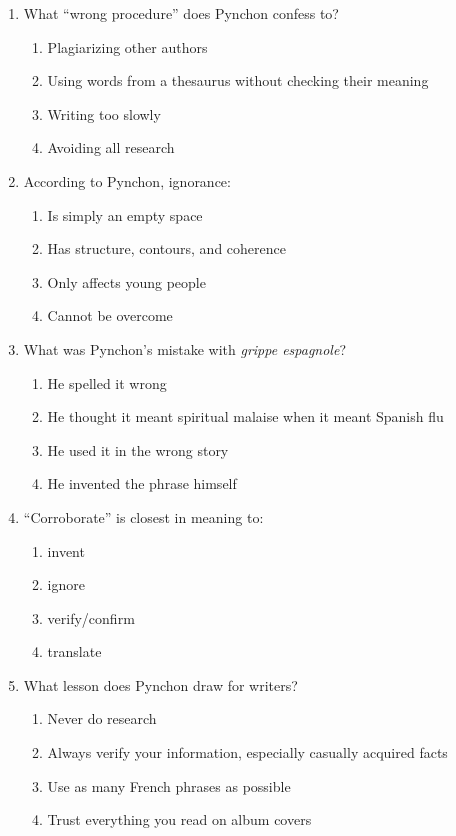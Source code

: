 \documentclass[10pt,a4paper]{article}
\begin{document}
\begin{enumerate}[label=\textbf{\arabic*.}, leftmargin=*]

\item What ``wrong procedure'' does Pynchon confess to?
\begin{enumerate}[label=(\Alph*)]
\item Plagiarizing other authors
\item Using words from a thesaurus without checking their meaning
\item Writing too slowly
\item Avoiding all research
\end{enumerate}

\item According to Pynchon, ignorance:
\begin{enumerate}[label=(\Alph*)]
\item Is simply an empty space
\item Has structure, contours, and coherence
\item Only affects young people
\item Cannot be overcome
\end{enumerate}

\item What was Pynchon's mistake with \emph{grippe espagnole}?
\begin{enumerate}[label=(\Alph*)]
\item He spelled it wrong
\item He thought it meant spiritual malaise when it meant Spanish flu
\item He used it in the wrong story
\item He invented the phrase himself
\end{enumerate}

\item ``Corroborate'' is closest in meaning to:
\begin{enumerate}[label=(\Alph*)]
\item invent \item ignore \item verify/confirm \item translate
\end{enumerate}

\item What lesson does Pynchon draw for writers?
\begin{enumerate}[label=(\Alph*)]
\item Never do research
\item Always verify your information, especially casually acquired facts
\item Use as many French phrases as possible
\item Trust everything you read on album covers
\end{enumerate}
\end{enumerate}
\end{document}
